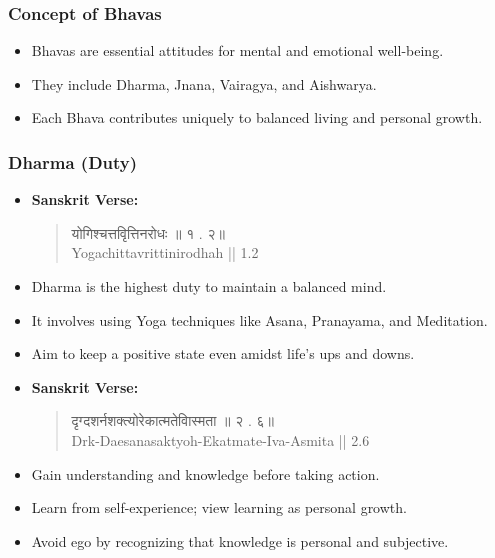\begin{frame}[fragile]\frametitle{Concept of Bhavas}

      \begin{itemize}
        \item Bhavas are essential attitudes for mental and emotional well-being.
        \item They include Dharma, Jnana, Vairagya, and Aishwarya.
        \item Each Bhava contributes uniquely to balanced living and personal growth.
      \end{itemize}

\end{frame}

\begin{frame}[fragile]\frametitle{Dharma (Duty)}

      \begin{itemize}
        \item \textbf{Sanskrit Verse:} 
        \begin{quote}
        योगिश्चत्तवृित्तिनरोधः   ॥   १ . २॥ \\
        Yogachittavrittinirodhah || 1.2
        \end{quote}
        \item Dharma is the highest duty to maintain a balanced mind.
        \item It involves using Yoga techniques like Asana, Pranayama, and Meditation.
        \item Aim to keep a positive state even amidst life’s ups and downs.

        \item \textbf{Sanskrit Verse:} 
        \begin{quote}
        दृग्दशर्नशक्त्योरेकात्मतेवािस्मता   ॥   २ . ६॥ \\
        Drk-Daesanasaktyoh-Ekatmate-Iva-Asmita || 2.6
        \end{quote}
        \item Gain understanding and knowledge before taking action.
        \item Learn from self-experience; view learning as personal growth.
        \item Avoid ego by recognizing that knowledge is personal and subjective.
      \end{itemize}	  

\end{frame}

